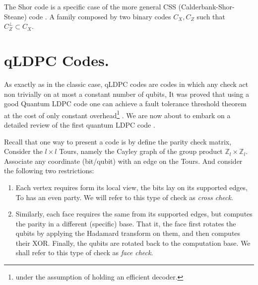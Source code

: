 The Shor code is a specific case of the more general CSS (Calderbank-Shor-Steane) code \cite{Calderbank_1996}. A family composed by two binary codes $C_{X}, C_{Z}$ such that $C_{Z}^{\perp} \subset C_{X}$. 



  \section{qLDPC Codes.}
  As exactly as in the classic case, qLDPC codes are codes in which any check act non trivially on at most a constant number of qubits, It was proved that using a good Quantum LDPC code one can achieve a fault tolerance threshold theorem at the cost of only constant overhead\footnote{under the assumption of holding an efficient decoder.} \cite{gottesman2014faulttolerant}. We are now about to embark on a detailed review of the first quantum LDPC code \cite{Dennis_2002}. 

  Recall that one way to present a code is by define the parity check matrix, Consider the $l\times l$ Tours, namely the Cayley graph of the group product  $\mathbb{Z}_{l} \times \mathbb{Z}_{l}$. Associate any coordinate (bit/qubit) with an edge on the Tours. And consider the following two restrictions:

  \begin{enumerate}
    \item Each vertex requires form its local view, the bits lay on its supported edges, To has an even party. We will refer to this type of check as \textit{cross check}. 
    \item Similarly, each face requires the same from its supported edges, but computes the parity in a different (specific) base. That it, the face first rotates the qubits by applying the Hadamard transform on them, and then computes their XOR. Finally, the qubits are rotated back to the computation base. We shall refer to this type of check as \textit{face check}.
  \end{enumerate}

